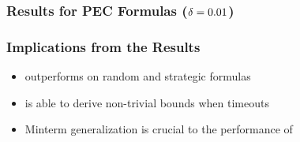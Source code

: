 \begin{frame}
    \frametitle{Results for PEC Formulas ($\delta=0.01$)}
    \begin{table}[ht]
        \centering
        \tiny
    \end{table}
\end{frame}

\begin{frame}
    \frametitle{Implications from the Results}
    \begin{itemize}
        \item \ressat outperforms \dcssat on random and strategic formulas
              \pause
        \item \ressat is able to derive non-trivial bounds when \dcssat timeouts
              \pause
        \item Minterm generalization is crucial to the performance of \ressat
    \end{itemize}
\end{frame}